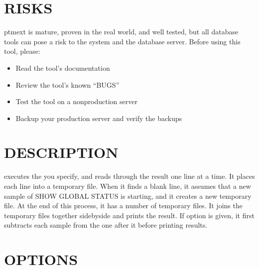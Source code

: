 \documentclass[letterpaper,10pt,english]{sphinxmanual}
\begin{document}
\section{RISKS}
\label{\detokenize{mariadb-status-diff:risks}}
pt\sphinxhyphen{}mext is mature, proven in the real world, and well tested,
but all database tools can pose a risk to the system and the database
server.  Before using this tool, please:
\begin{itemize}
\item {} 
Read the tool’s documentation

\item {} 
Review the tool’s known “BUGS”

\item {} 
Test the tool on a non\sphinxhyphen{}production server

\item {} 
Backup your production server and verify the backups

\end{itemize}


\section{DESCRIPTION}
\label{\detokenize{mariadb-status-diff:description}}
 executes the  you specify, and reads through the result one
line at a time.  It places each line into a temporary file.  When it finds a
blank line, it assumes that a new sample of SHOW GLOBAL STATUS is starting,
and it creates a new temporary file.  At the end of this process, it has a
number of temporary files.  It joins the temporary files together side\sphinxhyphen{}by\sphinxhyphen{}side
and prints the result.  If {\hyperref[\detokenize{mariadb-status-diff:cmdoption-mariadb-status-diff-relative}]{}} option is given, it first subtracts
each sample from the one after it before printing results.


\section{OPTIONS}
\label{\detokenize{mariadb-status-diff:options}}
\end{document}

